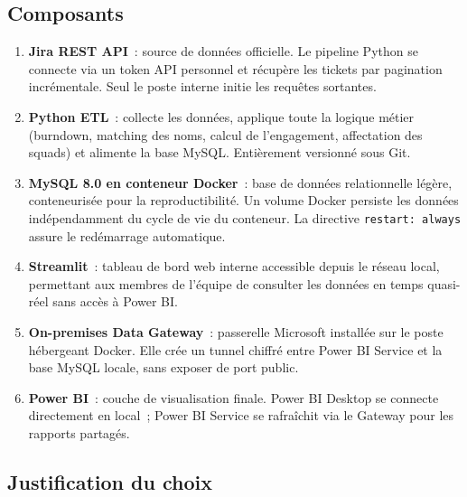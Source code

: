 \documentclass[12pt, a4paper]{article}
\begin{document}
\vspace{0.4cm}

\subsection{Composants}

\begin{enumerate}[leftmargin=2em, itemsep=6pt]

  \item \textbf{Jira REST API}~: source de données officielle. Le pipeline
        Python se connecte via un token API personnel et récupère les tickets
        par pagination incrémentale. Seul le poste interne initie les requêtes
        sortantes.

  \item \textbf{Python ETL}~: collecte les données, applique toute la logique
        métier (burndown, matching des noms, calcul de l'engagement, affectation
        des squads) et alimente la base MySQL. Entièrement versionné sous Git.

  \item \textbf{MySQL 8.0 en conteneur Docker}~: base de données relationnelle
        légère, conteneurisée pour la reproductibilité. Un volume Docker persiste
        les données indépendamment du cycle de vie du conteneur. La directive
        \texttt{restart: always} assure le redémarrage automatique.

  \item \textbf{Streamlit}~: tableau de bord web interne accessible depuis le
        réseau local, permettant aux membres de l'équipe de consulter les données
        en temps quasi-réel sans accès à Power BI.

  \item \textbf{On-premises Data Gateway}~: passerelle Microsoft installée sur
        le poste hébergeant Docker. Elle crée un tunnel chiffré entre Power BI
        Service et la base MySQL locale, sans exposer de port public.

  \item \textbf{Power BI}~: couche de visualisation finale. Power BI Desktop
        se connecte directement en local~; Power BI Service se rafraîchit via
        le Gateway pour les rapports partagés.

\end{enumerate}

\vspace{0.3cm}

\subsection{Justification du choix}
\end{document}
